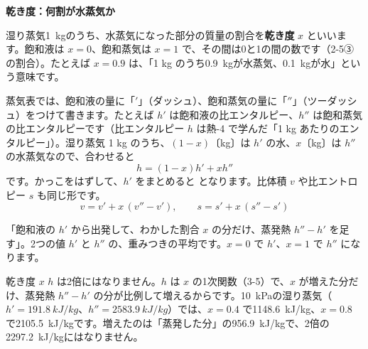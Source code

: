 \noindent\textbf{乾き度：何割が水蒸気か}\par\nobreak
湿り蒸気\qty{1}{kg}のうち、水蒸気になった部分の質量の割合を\textbf{乾き度} $x$ といいます。飽和液は $x=0$、飽和蒸気は $x=1$ で、その間は0と1の間の数です（2-5③の割合）。たとえば $x=0.9$ は、「1 kg のうち\qty{0.9}{kg}が水蒸気、\qty{0.1}{kg}が水」という意味です。

蒸気表では、飽和液の量に「$'$」（ダッシュ）、飽和蒸気の量に「$''$」（ツーダッシュ）をつけて書きます。たとえば $h'$ は飽和液の比エンタルピー、$h''$ は飽和蒸気の比エンタルピーです（比エンタルピー $h$ は熱-4 で学んだ「1 kg あたりのエンタルピー」）。湿り蒸気 1 kg のうち、$(1-x)$〔kg〕は $h'$ の水、$x$〔kg〕は $h''$ の水蒸気なので、合わせると
\[ h=(1-x)h'+xh'' \]
です。かっこをはずして、$h'$ をまとめると
となります。\label{ph:熱-8:kawaki}比体積 $v$ や比エントロピー $s$ も同じ形です。
\[ v=v'+x\,(v''-v'),\qquad s=s'+x\,(s''-s') \]
\begin{phyomi}[$h=h'+x(h''-h')$]
「飽和液の $h'$ から出発して、わかした割合 $x$ の分だけ、蒸発熱 $h''-h'$ を足す」。2つの値 $h'$ と $h''$ の、重みつきの平均です。$x=0$ で $h'$、$x=1$ で $h''$ になります。
\end{phyomi}
\begin{phbaisuru}{乾き度 $x$}
$h$ は2倍にはなりません。$h$ は $x$ の1次関数（3-5）で、$x$ が増えた分だけ、蒸発熱 $h''-h'$ の分が比例して増えるからです。\qty{10}{kPa}の湿り蒸気（$h'=\qty{191.8}{kJ/kg}$、$h''=\qty{2583.9}{kJ/kg}$）では、$x=0.4$ で\qty{1148.6}{kJ/kg}、$x=0.8$ で\qty{2105.5}{kJ/kg}です。増えたのは「蒸発した分」の\qty{956.9}{kJ/kg}で、2倍の\qty{2297.2}{kJ/kg}にはなりません。
\par\vspace{2pt}\centering
{}
\end{phbaisuru}

